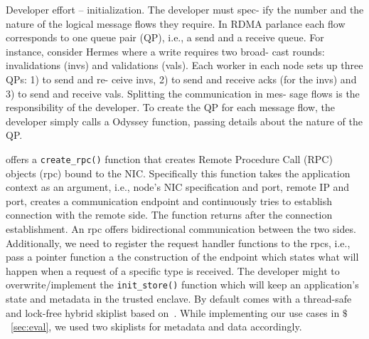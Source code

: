 
Developer effort – initialization. The developer must spec-
ify the number and the nature of the logical message flows
they require. In RDMA parlance each flow corresponds to
one queue pair (QP), i.e., a send and a receive queue. For
instance, consider Hermes where a write requires two broad-
cast rounds: invalidations (invs) and validations (vals). Each
worker in each node sets up three QPs: 1) to send and re-
ceive invs, 2) to send and receive acks (for the invs) and 3) to
send and receive vals. Splitting the communication in mes-
sage flows is the responsibility of the developer. To create
the QP for each message flow, the developer simply calls a
Odyssey function, passing details about the nature of the QP.

\fi






\projecttitle{} offers a \texttt{create\_rpc()} function that creates Remote Procedure Call (RPC) objects (rpc) bound to the NIC. Specifically this function takes the application context as an argument, i.e., node's NIC specification and port, remote IP and port, creates a communication endpoint and continuously tries to establish connection with the remote side. The function returns after the connection establishment. An rpc offers bidirectional communication between the two sides. Additionally, we need to register the request handler functions to the rpcs, i.e., pass a pointer function a the construction of the endpoint which states what will happen when a request of a specific type is received. The developer might to overwrite/implement the \texttt{init\_store()} function which will keep an application's state and metadata in the trusted enclave. By default \projecttitle{} comes with a thread-safe and lock-free hybrid skiplist based on~\cite{avocado, folly}. While implementing our use cases in $\$$~\ref{sec:eval}, we used two  \projecttitle{} skiplists for metadata and data accordingly.  %
\fi

